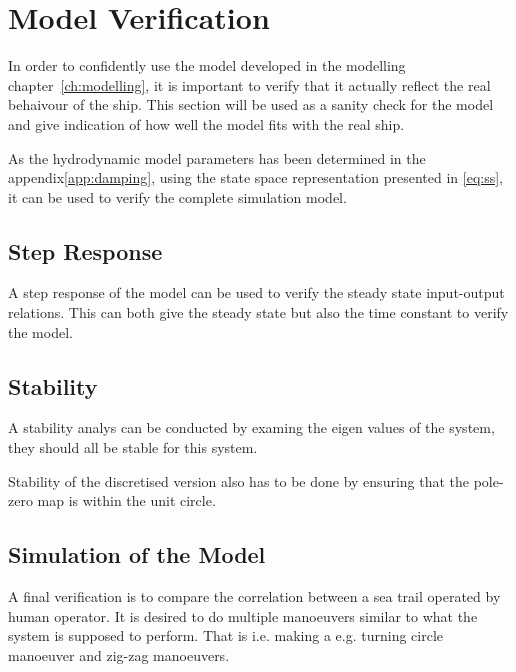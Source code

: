 \section{Model Verification}
\label{sec:model_verification}
In order to confidently use the model developed in the modelling chapter~\vref{ch:modelling}, it is important to verify that it actually reflect the real behaivour of the ship. This section will be used as a sanity check for the model and give indication of how well the model fits with the real ship.

As the hydrodynamic model parameters has been determined in the appendix\vref{app:damping}, using the state space representation presented in \vref{eq:ss}, it can be used to verify the complete simulation model.

\subsection{Step Response}
A step response of the model can be used to verify the steady state input-output relations. This can both give the steady state but also the time constant to verify the model.

\subsection{Stability}
A stability analys can be conducted by examing the eigen values of the system, they should all be stable for this system.

Stability of the discretised version also has to be done by ensuring that the pole-zero map is within the unit circle.

\subsection{Simulation of the Model}
A final verification is to compare the correlation between a sea trail operated by human operator. It is desired to do multiple manoeuvers similar to what the system is supposed to perform. That is i.e. making a e.g. turning circle manoeuver and zig-zag manoeuvers.
